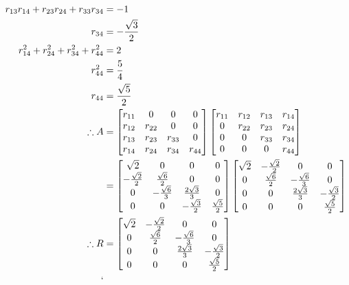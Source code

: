 \documentclass{article}
\begin{document}
\begin{enumerate}
\begin{align*}
r_{13}r_{14}+r_{23}r_{24}+r_{33}r_{34}&=-1\\
r_{34}&=-\frac{\sqrt{3}}{2}\\
r_{14}^2+r_{24}^2+r_{34}^2+r_{44}^2&=2\\
r_{44}^2&=\frac{5}{4}\\
r_{44}&=\frac{\sqrt{5}}{2}\\
\therefore A&=\begin{bmatrix}
r_{11}&0&0&0\\
r_{12}&r_{22}&0&0\\
r_{13}&r_{23}&r_{33}&0\\
r_{14}&r_{24}&r_{34}&r_{44}\\
\end{bmatrix} \begin{bmatrix}
r_{11}&r_{12}&r_{13}&r_{14}\\
0&r_{22}&r_{23}&r_{24}\\
0&0&r_{33}&r_{34}\\
0&0&0&r_{44}
\end{bmatrix}\\&=\begin{bmatrix}
\sqrt{2}&0&0&0\\
-\frac{\sqrt{2}}{2}&\frac{\sqrt{6}}{2}&0&0\\
0&-\frac{\sqrt{6}}{3}&\frac{2\sqrt{3}}{3}&0\\
0&0&-\frac{\sqrt{3}}{2}&\frac{\sqrt{5}}{2}\\
\end{bmatrix} \begin{bmatrix}
\sqrt{2}&-\frac{\sqrt{2}}{2}&0&0\\
0&\frac{\sqrt{6}}{2}&-\frac{\sqrt{6}}{3}&0\\
0&0&\frac{2\sqrt{3}}{3}&-\frac{\sqrt{3}}{2}\\
0&0&0&\frac{\sqrt{5}}{2}
\end{bmatrix}\\
\therefore R&=\begin{bmatrix}
\sqrt{2}&-\frac{\sqrt{2}}{2}&0&0\\
0&\frac{\sqrt{6}}{2}&-\frac{\sqrt{6}}{3}&0\\
0&0&\frac{2\sqrt{3}}{3}&-\frac{\sqrt{3}}{2}\\
0&0&0&\frac{\sqrt{5}}{2}
\end{bmatrix}\\`
\end{align*}
\end{enumerate}
\end{document}
